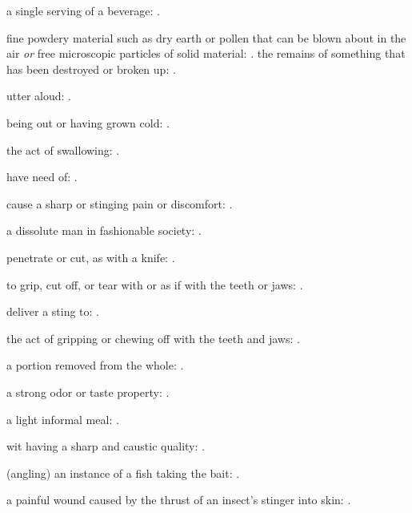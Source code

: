   a single serving of a beverage: .

  fine powdery material such as dry earth or pollen that can be blown about in the air \textit{or} free microscopic particles of solid material: . the remains of something that has been destroyed or broken up:   .

  utter aloud: .

  being out or having grown cold:   .

  the act of swallowing:   .

  have need of:   .

  cause a sharp or stinging pain or discomfort:   .

  a dissolute man in fashionable society:   .

  penetrate or cut, as with a knife: .

  to grip, cut off, or tear with or as if with the teeth or jaws:   .

  deliver a sting to:   .

  the act of gripping or chewing off with the teeth and jaws:   .

  a portion removed from the whole: .

  a strong odor or taste property:   .

  a light informal meal:   .

  wit having a sharp and caustic quality:   .

  (angling) an instance of a fish taking the bait: .

  a painful wound caused by the thrust of an insect's stinger into skin:   .

